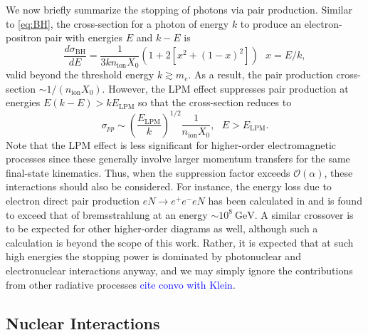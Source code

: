 \documentclass[twocolumn,showpacs,preprintnumbers,amsmath,amssymb,prd]{revtex4}
\newcommand{\OO}{\mathcal{O}}
\newcommand{\GeV}{\text{GeV}}
\def\r{\right)}
\def\l{\left(}
\begin{document}
\begin{appendices}
We now briefly summarize the stopping of photons via pair production. Similar to \eqref{eq:BH}, the cross-section for a photon of energy $k$ to produce an electron-positron pair with energies $E$ and $k-E$ is
\begin{equation}
\label{eq:PP}
\frac{d \sigma_\text{BH}}{dE} = \frac{1}{3 k n_\text{ion} X_0} (1+ 2[x^2+ (1-x)^2]) ~~~ x = E/k,
\end{equation}
valid beyond the threshold energy $k \gtrsim m_e$. 
As a result, the pair production cross-section $\sim 1/(n_\text{ion} X_0)$.
However, the LPM effect suppresses pair production at energies $E(k-E) > k E_\text{LPM}$ so that the cross-section reduces to
\begin{equation}
\sigma_{pp} \sim \l\frac{E_\text{LPM}}{k} \r^{1/2} \frac{1}{n_\text{ion} X_0}, ~~~ E>E_\text{LPM}.
\end{equation}
Note that the LPM effect is less significant for higher-order electromagnetic processes since these generally involve larger momentum transfers for the same final-state kinematics.
Thus, when the suppression factor exceeds $\OO(\alpha)$, these interactions should also be considered.
For instance, the energy loss due to electron direct pair production $eN \to e^+ e^- e N$ has been calculated in \cite{Gerhardt:2010bj} and is found to exceed that of bremsstrahlung at an energy $\sim 10^{8} ~\GeV$. 
A similar crossover is to be expected for other higher-order diagrams as well, although such a calculation is beyond the scope of this work. 
Rather, it is expected that at such high energies the stopping power is dominated by photonuclear and electronuclear interactions anyway, and we may simply ignore the contributions from other radiative processes \textcolor{blue}{cite convo with Klein}. 

\subsection{Nuclear Interactions}


\end{appendices}
\end{document}
